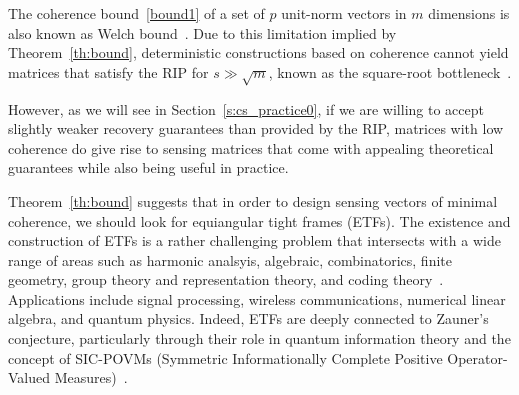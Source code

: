 The coherence bound~\eqref{bound1} of a set of $p$ unit-norm vectors in $m$ dimensions is also known as Welch bound~\cite{welch2003lower}. Due to this limitation implied by Theorem~\ref{th:bound}, deterministic constructions based on coherence cannot yield matrices that satisfy the RIP for $s\gg \sqrt{m}$, known as the square-root bottleneck~\cite{Bandeira_RoadRIP,Tao_blog_deterministicRIP,JBourgain_etal_2011_RIP,Bandeira_ConditionalPaley}.



However, as we will see in Section~\ref{s:cs_practice0}, if we are willing to accept slightly weaker recovery guarantees than provided by the RIP, matrices with low coherence do give rise to sensing matrices that come with appealing theoretical guarantees while also being useful in practice.

Theorem~\ref{th:bound} suggests that in order to design sensing vectors of minimal coherence, we should  look for equiangular tight frames (ETFs). The existence and construction of ETFs is a rather challenging problem that intersects with a wide range of areas such as harmonic analsyis, algebraic, combinatorics, finite geometry, group theory and representation theory, and coding theory~\cite{SH03,waldron2018introduction}. Applications include signal processing, wireless communications, numerical linear algebra, and quantum physics. Indeed, ETFs are deeply connected to Zauner's conjecture, particularly through their role in quantum information theory and the concept of SIC-POVMs (Symmetric Informationally Complete Positive Operator-Valued Measures)~\cite{zauner1999quantendesigns,Scott_Grassl_SICPOVM,appleby2019tight}.

